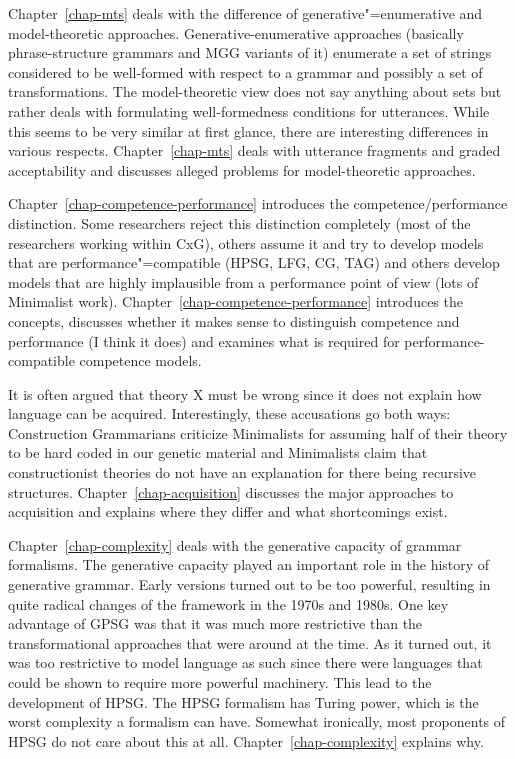 Chapter~\ref{chap-mts} deals with the difference of generative"=enumerative and model-theoretic
approaches. Generative-enumerative approaches (basically phrase-structure grammars and MGG variants
of it) enumerate a set of strings considered to be well-formed with respect to a grammar and
possibly a set of transformations. The model-theoretic view does not say anything about sets but
rather deals with formulating well-formedness conditions for utterances. While this seems to be very
similar at first glance, there are interesting differences in various
respects. Chapter~\ref{chap-mts} deals with utterance fragments and graded acceptability and
discusses alleged problems for model-theoretic approaches. 

Chapter~\ref{chap-competence-performance} introduces the competence/performance distinction. Some researchers
reject this distinction completely (most of the researchers working within CxG), others assume it
and try to develop models that are performance"=compatible (HPSG, LFG, CG, TAG) and others develop
models that are highly implausible from a performance point of view (lots of Minimalist
work). Chapter~\ref{chap-competence-performance} introduces the concepts, discusses whether it makes sense to
distinguish competence and performance (I think it does) and examines what is required for
performance-compatible competence models.

It is often argued that theory X must be wrong since it does not explain how language can be
acquired. Interestingly, these accusations go both ways: Construction Grammarians criticize
Minimalists for assuming half of their theory to be hard coded in our genetic material and
Minimalists claim that constructionist theories do not have an explanation for there being recursive
structures. Chapter~\ref{chap-acquisition} discusses the major approaches to acquisition and explains
where they differ and what shortcomings exist.

Chapter~\ref{chap-complexity} deals with the generative capacity of grammar formalisms. The
generative capacity played an important role in the history of generative grammar. Early versions
turned out to be too powerful, resulting in quite radical changes of the framework in the 1970s and
1980s. One key advantage of GPSG was that it was much more restrictive than the transformational
approaches that were around at the time. As it turned out, it was too restrictive to model language
as such since there were languages that could be shown to require more powerful machinery. This lead
to the development of HPSG. The HPSG formalism has Turing power, which is the worst complexity a formalism can
have. Somewhat ironically, most proponents of HPSG do not care about this at
all. Chapter~\ref{chap-complexity} explains why.

